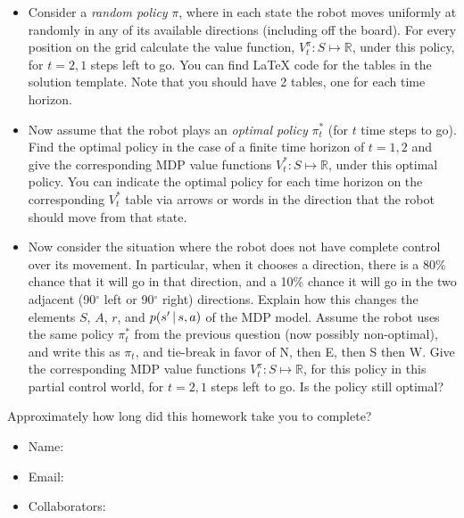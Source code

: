 \documentclass[submit]{harvardml}
\begin{document}
\begin{problem}
\begin{itemize}
    \item Consider a \emph{random policy} $\pi$, where
in each state the robot moves uniformly at randomly in any of its available directions (including off the board). 
      For every position on the grid calculate the
value function, $V^\pi_t: S\mapsto 
\mathbb{R}$, under this policy, for $t=2, 1$ steps left
to go. You can find LaTeX code for the tables in the solution template. Note that you should have 2 tables, one for each time horizon. 
%
    \item Now assume that the robot plays an \emph{optimal policy}
      $\pi^\ast_t$ (for $t$ time steps to go). Find the optimal policy in the case of a finite time horizon of $t = 1, 2$ and give the corresponding 
MDP value functions $V^\ast_t: S\mapsto 
\mathbb{R}$, under this
optimal policy. You can indicate the optimal policy for each time horizon on the corresponding $V^\ast_t$ table via arrows or words in the direction that the robot should move from that state. 
    \item Now consider the situation where the robot does not have
      complete control over its movement. In particular, 
when it chooses a direction, there is a 80\% chance that it will go in
      that direction, and a 10\% chance it will go in the two adjacent
      (90$^\circ$ left or 90$^\circ$ right) 
directions. Explain how this changes the elements $S$, $A$, $r$, and $p(s' \,|\, s,a)$ of the MDP model. 
Assume the robot uses the same
 policy $\pi^\ast_t$ from the previous question (now possibly
      non-optimal), and write this as $\pi_t$, and tie-break in favor of N, then E, then S then W.
Give the corresponding 
MDP value functions $V^\pi_t: S\mapsto 
\mathbb{R}$, for this policy in this partial control world, for $t=2, 1$ steps left
to go. Is the policy still optimal?
  \end{itemize}
\end{problem}


\newpage
\begin{problem}[Calibration, 1pt]
Approximately how long did this homework take you to complete?
\end{problem}


\begin{itemize}
    \item Name:
    \item Email:
    \item Collaborators:
\end{itemize}
\end{document}
